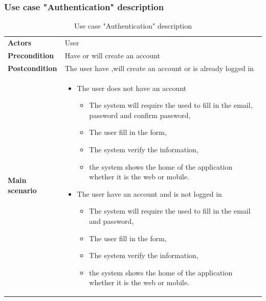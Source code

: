 \documentclass[12pt,a4paper]{report}
\begin{document}
\subsubsection*{Use case "Authentication" description}
\begin{table}[H]
	\begin{center}
		\captionsetup[table]{skip=10pt}
		\caption{Use case "Authentication" description}
		\setlength\doublerulesep{0.5pt}
\begin{tabular}{|  p{5cm}|  p{9cm}|}
	\rowcolor{LightCyan}
	
	\hline
	\multicolumn{2}{c}{Use case "Authentication"}\\
	\hline
	
	\textbf{Actors} &                        
	User 
	\\ \hline
	
	\textbf{Precondition} &                        
	Have or will create an account 
\\ \hline
	\textbf{Postcondition} &                        
	The user have ,will create an account or is already logged in 
	\\ \hline
	
	\textbf{Main scenario} &                        
	\begin{itemize}
		\item The user does not have an account
		\begin{itemize}
			\item The system will require the used to fill in the email, password and confirm password,
			\item The user fill in the form,
			\item The system verify the information,
			\item the system shows the home of the application whether it is the web or mobile.
		\end{itemize}
		\item The user have an account and is not logged in
		\begin{itemize}
			\item The system will require the used to fill in the email and password,
			\item The user fill in the form,
			\item The system verify the information,
			\item the system shows the home of the application whether it is the web or mobile.
		\end{itemize}

		
		
	\end{itemize} 

	
	
\end{tabular}
\end{center}

\end{table}
\end{document}
